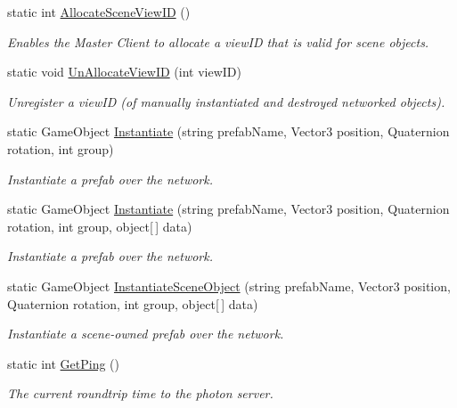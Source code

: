 \begin{DoxyCompactItemize}
static int \hyperlink{class_photon_network_a8a2bd25668b204f681c7d27174735ba1}{Allocate\+Scene\+View\+ID} ()
\begin{DoxyCompactList}\small\item\em Enables the Master Client to allocate a view\+ID that is valid for scene objects. \end{DoxyCompactList}\item 
static void \hyperlink{class_photon_network_ae5c32625fb17b425e105de49ea267ddf}{Un\+Allocate\+View\+ID} (int view\+ID)
\begin{DoxyCompactList}\small\item\em Unregister a view\+ID (of manually instantiated and destroyed networked objects). \end{DoxyCompactList}\item 
static Game\+Object \hyperlink{class_photon_network_a843d9f62d28ab123c83291c1e6bb857d}{Instantiate} (string prefab\+Name, Vector3 position, Quaternion rotation, int group)
\begin{DoxyCompactList}\small\item\em Instantiate a prefab over the network. \end{DoxyCompactList}\item 
static Game\+Object \hyperlink{class_photon_network_a6dbc821988042fe109d28017cd955c73}{Instantiate} (string prefab\+Name, Vector3 position, Quaternion rotation, int group, object\mbox{[}$\,$\mbox{]} data)
\begin{DoxyCompactList}\small\item\em Instantiate a prefab over the network. \end{DoxyCompactList}\item 
static Game\+Object \hyperlink{class_photon_network_a890353cbe3141ca134a1b0e28aa8ea9f}{Instantiate\+Scene\+Object} (string prefab\+Name, Vector3 position, Quaternion rotation, int group, object\mbox{[}$\,$\mbox{]} data)
\begin{DoxyCompactList}\small\item\em Instantiate a scene-\/owned prefab over the network. \end{DoxyCompactList}\item 
static int \hyperlink{class_photon_network_a901a33962274b4467919acd868016d6b}{Get\+Ping} ()
\begin{DoxyCompactList}\small\item\em The current roundtrip time to the photon server. \end{DoxyCompactList}\item 

\end{DoxyCompactItemize}
